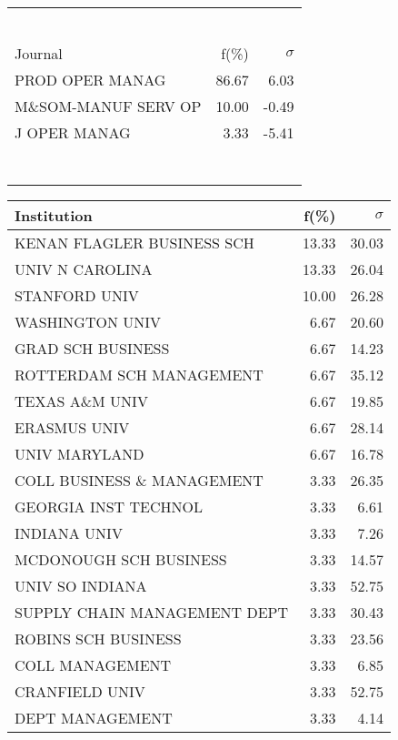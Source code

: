 \documentclass[a4paper,11pt]{report}
\begin{document}
\begin{landscape}
\begin{table}[!ht]
{\begin{tabular}{|l r r|}
 &  & \\
 &  & \\
 &  & \\
 &  & \\
 &  & \\
 &  & \\
\hline
\hline
Journal & f(\%) & $\sigma$\\
\hline
PROD OPER MANAG & 86.67 & 6.03\\
M\&SOM-MANUF SERV OP & 10.00 & -0.49\\
J OPER MANAG & 3.33 & -5.41\\
 &  & \\
 &  & \\
 &  & \\
 &  & \\
 &  & \\
 &  & \\
 &  & \\
\hline
\end{tabular}
}
{\scriptsize\begin{tabular}{|l r r|}
\hline
Institution & f(\%) & $\sigma$\\
\hline
KENAN FLAGLER BUSINESS SCH & 13.33 & 30.03\\
UNIV N CAROLINA & 13.33 & 26.04\\
STANFORD UNIV & 10.00 & 26.28\\
WASHINGTON UNIV & 6.67 & 20.60\\
GRAD SCH BUSINESS & 6.67 & 14.23\\
ROTTERDAM SCH MANAGEMENT & 6.67 & 35.12\\
TEXAS A\&M UNIV & 6.67 & 19.85\\
ERASMUS UNIV & 6.67 & 28.14\\
UNIV MARYLAND & 6.67 & 16.78\\
COLL BUSINESS \& MANAGEMENT & 3.33 & 26.35\\
GEORGIA INST TECHNOL & 3.33 & 6.61\\
INDIANA UNIV & 3.33 & 7.26\\
MCDONOUGH SCH BUSINESS & 3.33 & 14.57\\
UNIV SO INDIANA & 3.33 & 52.75\\
SUPPLY CHAIN MANAGEMENT DEPT & 3.33 & 30.43\\
ROBINS SCH BUSINESS & 3.33 & 23.56\\
COLL MANAGEMENT & 3.33 & 6.85\\
CRANFIELD UNIV & 3.33 & 52.75\\
DEPT MANAGEMENT & 3.33 & 4.14\\

\end{tabular}}
\end{table}
\end{landscape}
\end{document}
